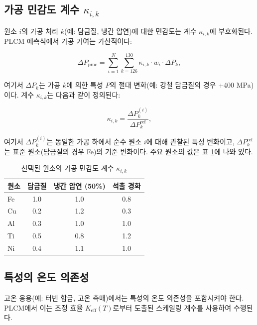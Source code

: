 \documentclass[12pt,a4paper]{article}
\newcommand{\Keff}{K_{\mathrm{eff}}}
\begin{document}
	\subsection{가공 민감도 계수 \(\kappa_{i,k}\)}
	\label{subsec:processing-coefficients}
	
	원소 \(i\)의 가공 처리 \(k\)(예: 담금질, 냉간 압연)에 대한 민감도는 계수 \(\kappa_{i,k}\)에 부호화된다. PLCM 예측식에서 가공 기여는 가산적이다:
	
	\begin{equation}
		\Delta P_{\text{proc}} = \sum_{i=1}^{N} \sum_{k=126}^{130} \kappa_{i,k} \cdot w_i \cdot \Delta P_k,
		\label{eq:proc-contribution}
	\end{equation}
	
	여기서 \(\Delta P_k\)는 가공 \(k\)에 의한 특성 \(P\)의 절대 변화(예: 강철 담금질의 경우 +400 MPa)이다. 계수 \(\kappa_{i,k}\)는 다음과 같이 정의된다:
	
	\begin{equation}
		\kappa_{i,k} = \frac{\Delta P_k^{(i)}}{\Delta P_k^{\text{ref}}},
		\label{eq:kappa-proc-def}
	\end{equation}
	
	여기서 \(\Delta P_k^{(i)}\)는 동일한 가공 하에서 순수 원소 \(i\)에 대해 관찰된 특성 변화이고, \(\Delta P_k^{\text{ref}}\)는 표준 원소(담금질의 경우 Fe)의 기준 변화이다. 주요 원소의 값은 표 \ref{tab:kappa-proc}에 나와 있다.
	
	\begin{table}[htbp]
		\centering
		\caption{선택된 원소의 가공 민감도 계수 \(\kappa_{i,k}\)}
		\label{tab:kappa-proc}
		\begin{tabular}{lccc}
			\toprule
			원소 & 담금질 & 냉간 압연 (50\%) & 석출 경화 \\
			\midrule
			Fe & 1.0 & 1.0 & 0.8 \\
			Cu & 0.2 & 1.2 & 0.3 \\
			Al & 0.3 & 1.0 & 1.0 \\
			Ti & 0.5 & 0.8 & 1.2 \\
			Ni & 0.4 & 1.1 & 1.0 \\
			\bottomrule
		\end{tabular}
	\end{table}
	
	\subsection{특성의 온도 의존성}
	\label{subsec:temperature-dependence}
	
	고온 응용(예: 터빈 합금, 고온 촉매)에서는 특성의 온도 의존성을 포함시켜야 한다. PLCM에서 이는 조정 효율 \(\Keff(T)\)로부터 도출된 스케일링 계수를 사용하여 수행된다.
	
\end{document}
